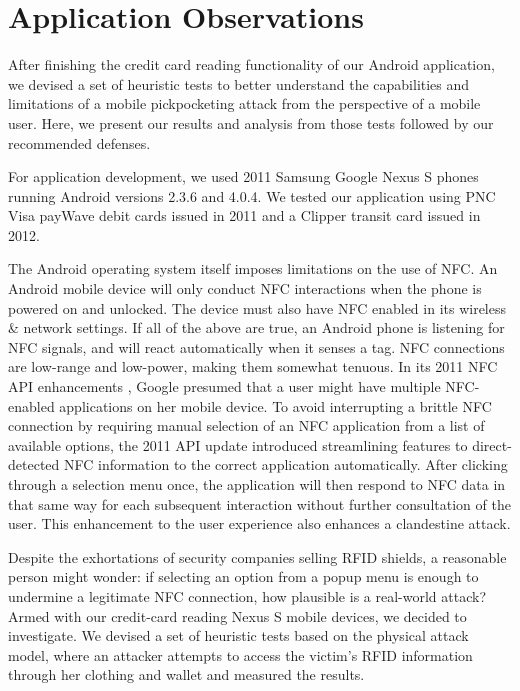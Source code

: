 \documentclass{IEEEtran}
\begin{document}
\section{Application Observations}
After finishing the credit card reading functionality of our Android application, we devised a set of heuristic tests to better understand the capabilities and limitations of a mobile pickpocketing attack from the perspective of a mobile user.  Here, we present our results and analysis from those tests followed by our recommended defenses.  

For application development, we used 2011 Samsung Google Nexus S phones running Android versions 2.3.6 and 4.0.4.  We tested our application using PNC Visa payWave debit cards issued in 2011 and a Clipper transit card issued in 2012.

The Android operating system itself imposes limitations on the use of NFC.  An Android mobile device will only conduct NFC interactions when the phone is powered on and unlocked.  The device must also have NFC enabled in its wireless 
\& network settings.  If all of the above are true, an Android phone is listening for NFC signals, and will react automatically when it senses a tag.  NFC connections are low-range and low-power, making them somewhat tenuous.  In its 2011 NFC API enhancements \cite{android-developers-nfc-basics}, Google presumed that a user might have multiple NFC-enabled applications on her mobile device.  To avoid interrupting a brittle NFC connection by requiring manual selection of an NFC application from a list of available options, the 2011 API update introduced streamlining features to direct-detected NFC information to the correct application automatically.  After clicking through a selection menu once, the application will then respond to NFC data in that same way for each subsequent interaction without further consultation of the user.  This enhancement to the user experience also enhances a clandestine attack.

Despite the exhortations of security companies selling RFID shields, a reasonable person might wonder:  if selecting an option from a popup menu is enough to undermine a legitimate NFC connection, how plausible is a real-world attack?  Armed with our credit-card reading Nexus S mobile devices, we decided to investigate.  We devised a set of heuristic tests based on the physical attack model, where an attacker attempts to access the victim's RFID information through her clothing and wallet and measured the results.  
\end{document}
